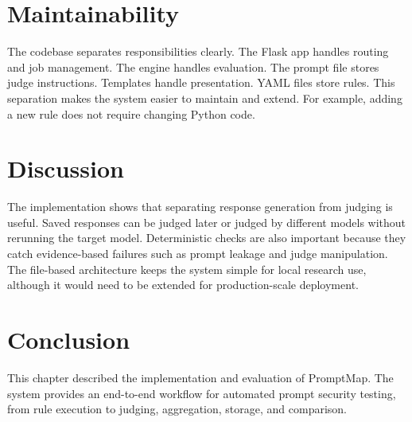 \section{Maintainability}
The codebase separates responsibilities clearly. The Flask app handles routing and job management. The engine handles evaluation. The prompt file stores judge instructions. Templates handle presentation. YAML files store rules. This separation makes the system easier to maintain and extend. For example, adding a new rule does not require changing Python code.

\section{Discussion}
The implementation shows that separating response generation from judging is useful. Saved responses can be judged later or judged by different models without rerunning the target model. Deterministic checks are also important because they catch evidence-based failures such as prompt leakage and judge manipulation. The file-based architecture keeps the system simple for local research use, although it would need to be extended for production-scale deployment.

\section{Conclusion}
This chapter described the implementation and evaluation of PromptMap. The system provides an end-to-end workflow for automated prompt security testing, from rule execution to judging, aggregation, storage, and comparison.
